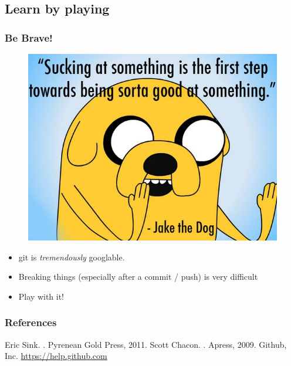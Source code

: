 \documentclass{beamer}
\begin{document}
\subsection[Learn by playing]{Learn by playing}

\begin{frame}
\frametitle{Be Brave!}
\begin{figure}[!t] \centering
\includegraphics[width=.4\textwidth]{figures/jake-quote}
\end{figure}
\begin{itemize}
\item git is \emph{tremendously} googlable.
\item Breaking things (especially after a commit / push) is very difficult
\item Play with it!
\end{itemize}
\end{frame}

\begin{frame}[allowframebreaks]
  \frametitle<presentation>{References}    
  \begin{thebibliography}{10}    
  \beamertemplatebookbibitems
    Eric Sink.
    .
    \newblock Pyrenean Gold Press, 2011.
    Scott Chacon.
    .
    \newblock Apress, 2009.
  \beamertemplatearticlebibitems
    Github, Inc.
    \newblock \url{https://help.github.com}
  \end{thebibliography}
\end{frame}
\end{document}
